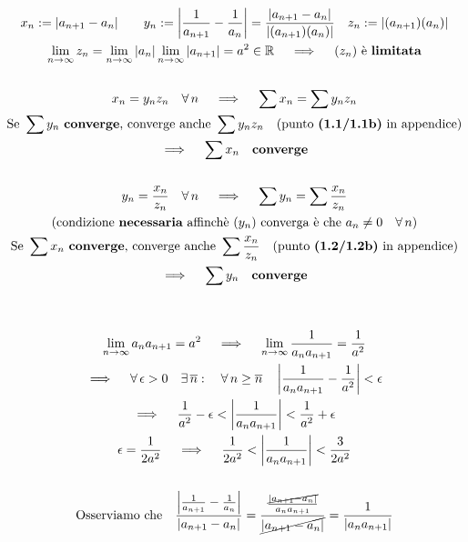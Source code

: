 \documentclass[11pt,reqno]{amsart}
\begin{document}
\iffalse
\begin{gather*}
 x_n := |a_{n+1}-a_n| \quad \quad y_n := \left|\frac{1}{a_{n+1}} - \frac{1}{a_n}\right| = \frac{|a_{n+1} - a_n|}{|(a_{n+1})(a_n)|} \quad z_n := |(a_{n+1})(a_n)|\\
 \lim_{n \to \infty} z_n = \lim_{n \to \infty} |a_n| \lim_{n \to \infty} |a_{n+1}| = a^2 \in \mathbb{R} \quad \implies \quad (z_n) \text{ è } \textbf{limitata}\\\\
 x_n = y_nz_n \quad \forall \, n \quad \implies \quad \sum x_n = \sum y_nz_n\\
 \text{Se } \sum y_n \,\, \textbf{converge} \text{, converge anche } \sum y_nz_n \quad \text{(punto } \textbf{(1.1/1.1b)} \text{ in appendice)}\\
 \implies \quad \sum x_n \quad \textbf{converge}\\\\
 y_n = \frac{x_n}{z_n} \quad \forall \, n \quad \implies \quad \sum y_n = \sum \frac{x_n}{z_n}\\
 \text{(condizione } \textbf{necessaria} \text{ affinchè } (y_n) \text{ converga è che } a_n \neq 0 \quad \forall \, n \text{)}\\
 \text{Se } \sum x_n \,\, \textbf{converge} \text{, converge anche } \sum \frac{x_n}{z_n} \quad \text{(punto } \textbf{(1.2/1.2b)} \text{ in appendice)}\\
 \implies \quad \sum y_n \quad \textbf{converge}\\\\\\
 \lim_{n \to \infty} a_na_{n+1} = a^2 \quad \implies \quad \lim_{n \to \infty} \frac{1}{a_na_{n+1}} = \frac{1}{a^2}\\
 \implies \quad \forall \, \epsilon > 0 \quad \exists \, \overline{n}: \quad \forall \, n \geq \overline{n} \quad \left|\frac{1}{a_na_{n+1}} - \frac{1}{a^2}\right| < \epsilon\\
 \implies \quad \frac{1}{a^2} - \epsilon < \left|\frac{1}{a_na_{n+1}}\right| < \frac{1}{a^2} + \epsilon\\
 \epsilon = \frac{1}{2a^2} \quad \implies \quad \frac{1}{2a^2} < \left|\frac{1}{a_na_{n+1}}\right| < \frac{3}{2a^2}\\\\
 \text{Osserviamo che} \quad \frac{\left|\frac{1}{a_{n+1}}-\frac{1}{a_n}\right|}{|a_{n+1} - a_n|} = \frac{\frac{\cancel{|a_{n+1}-a_n|}}{a_na_{n+1}}}{\cancel{|a_{n+1}-a_n|}} = \frac{1}{|a_na_{n+1}|}\\\\

\end{gather*}
\end{document}
